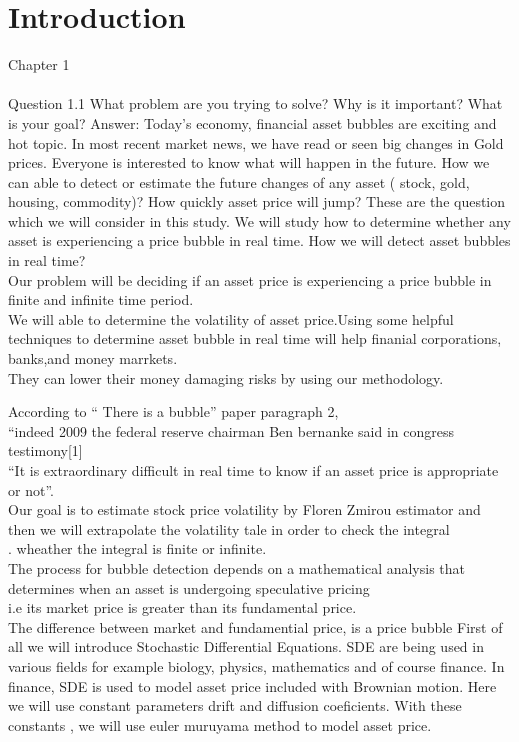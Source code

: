 \section{Introduction}
Chapter 1\\\\
Question 1.1 What problem are you trying to solve?  Why is it important? What is your goal?
Answer: Today's economy, financial asset bubbles are exciting and hot topic. 
In most recent market news, we have read or seen big changes in Gold prices. 
Everyone is interested to know what will happen in the future. 
How we can able to detect or estimate the future changes of any asset ( stock, gold, housing, commodity)? 
How quickly asset price will jump? These are the question which we will consider in this study. 
We will study how to determine whether any asset is experiencing a price bubble in real time. 
How we will detect asset bubbles in real time?\\
Our problem will be deciding if an asset price is experiencing a price bubble in finite and infinite time period.\\
We will able to determine the volatility of asset price.Using some helpful techniques to determine asset bubble in real time will help finanial corporations, banks,and money marrkets.\\
They can lower their money damaging risks by using our methodology.

According to `` There is a bubble'' paper paragraph 2, \\
``indeed 2009 the federal reserve chairman Ben bernanke said in congress testimony[1]\\
``It is extraordinary difficult in real time to know if an asset price is appropriate or not''.\\
Our goal is to estimate stock price volatility by Floren Zmirou estimator and then we will extrapolate the volatility tale in order to check the integral\\.
wheather the integral is finite or infinite. \\
 The process for bubble detection depends on a mathematical analysis that determines when an asset is undergoing speculative pricing\\
 i.e its market price is greater than its fundamental price.\\
 The difference between market and fundamential price, is a price bubble 
 First of all we will introduce Stochastic Differential Equations. 
 SDE are being used in various fields for example biology, physics, mathematics and of course finance. 
 In finance, SDE is used to model asset price included with Brownian motion. 
 Here we will use constant parameters drift and diffusion coeficients. 
 With these constants , we will use euler muruyama method to model asset price. \\
 
 
 


